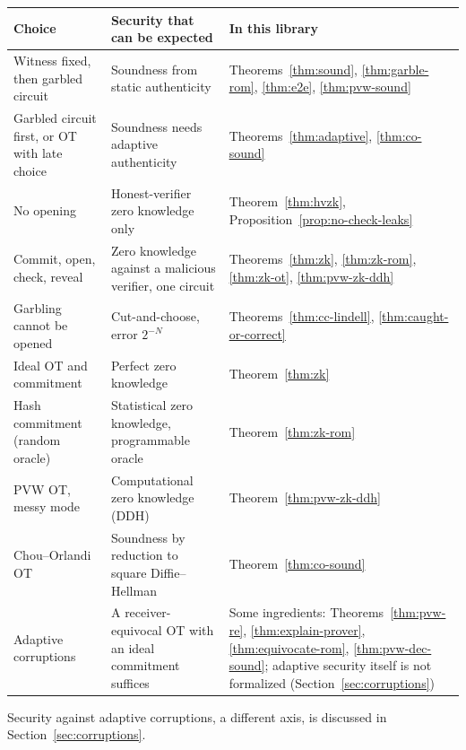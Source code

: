 \begin{center}
\begin{tabular}{|p{}|p{}|p{}|}
  \hline
  \textbf{Choice} & \textbf{Security that can be expected} & \textbf{In this library} \\
  \hline
  Witness fixed, then garbled circuit & Soundness from static authenticity & Theorems~\ref{thm:sound}, \ref{thm:garble-rom}, \ref{thm:e2e}, \ref{thm:pvw-sound} \\
  \hline
  Garbled circuit first, or OT with late choice & Soundness needs adaptive authenticity & Theorems~\ref{thm:adaptive}, \ref{thm:co-sound} \\
  \hline
  No opening & Honest-verifier zero knowledge only & Theorem~\ref{thm:hvzk}, Proposition~\ref{prop:no-check-leaks} \\
  \hline
  Commit, open, check, reveal & Zero knowledge against a malicious verifier, one circuit & Theorems~\ref{thm:zk}, \ref{thm:zk-rom}, \ref{thm:zk-ot}, \ref{thm:pvw-zk-ddh} \\
  \hline
  Garbling cannot be opened & Cut-and-choose, error $2^{-N}$ & Theorems~\ref{thm:cc-lindell}, \ref{thm:caught-or-correct} \\
  \hline
  Ideal OT and commitment & Perfect zero knowledge & Theorem~\ref{thm:zk} \\
  \hline
  Hash commitment (random oracle) & Statistical zero knowledge, programmable oracle & Theorem~\ref{thm:zk-rom} \\
  \hline
  PVW OT, messy mode & Computational zero knowledge (DDH) & Theorem~\ref{thm:pvw-zk-ddh} \\
  \hline
  Chou--Orlandi OT & Soundness by reduction to square Diffie--Hellman & Theorem~\ref{thm:co-sound} \\
  \hline
  Adaptive corruptions & A receiver-equivocal OT with an ideal commitment suffices \cite{GKPS18} & Some ingredients:
  Theorems~\ref{thm:pvw-re}, \ref{thm:explain-prover}, \ref{thm:equivocate-rom}, \ref{thm:pvw-dec-sound}; adaptive
  security itself is not formalized (Section~\ref{sec:corruptions}) \\
  \hline
\end{tabular}
\end{center}

Security against adaptive corruptions, a different axis, is discussed in
Section~\ref{sec:corruptions}.
